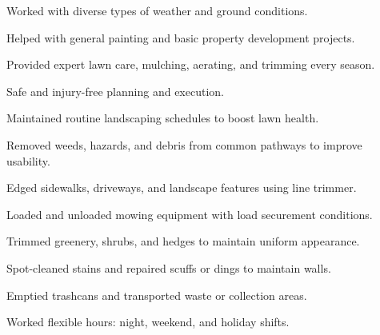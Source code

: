 \begin{cventries}
{\begin{cvitems}
        \item {Worked with diverse types of weather and ground conditions.}
        \item {Helped with general painting and basic property development projects.}
        \item {Provided expert lawn care, mulching, aerating, and trimming every season.}
        \item {Safe and injury-free planning and execution.}
        \item {Maintained routine landscaping schedules to boost lawn health.}
        \item {Removed weeds, hazards, and debris from common pathways to improve usability.}
        \item{Edged sidewalks, driveways, and landscape features using line trimmer.}
        \item{Loaded and unloaded mowing equipment with load securement conditions.}
        \item{Trimmed greenery, shrubs, and hedges to maintain uniform appearance.}
        \item{Spot-cleaned stains and repaired scuffs or dings to maintain walls.}
        \item{Emptied trashcans and transported waste or collection areas.}
        \item{Worked flexible hours: night, weekend, and holiday shifts.}
      \end{cvitems}
    }


\end{cventries}
